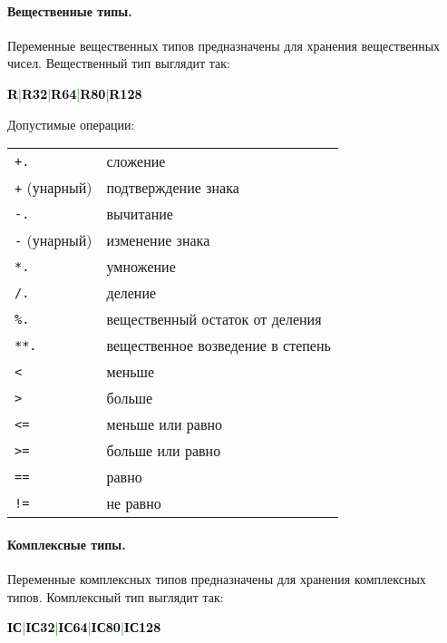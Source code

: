 \documentclass[10pt]{report}
\begin{document}
            \paragraph{Вещественные типы.}Переменные вещественных типов предназначены для хранения вещественных чисел. Вещественный тип выглядит так:
\begin{center}
\noindent\textcolor{Green}{\textcolor{Black}{\textbf{R}}|\textcolor{Black}{\textbf{R32}}|\textcolor{Black}{\textbf{R64}}|\textcolor{Black}{\textbf{R80}}|\textcolor{Black}{\textbf{R128}}}
\end{center}

Допустимые операции:
\begin{longtable}{ll}
\texttt{+.}             & сложение                                          \\
\texttt{+} (унарный)    & подтверждение знака                               \\
\texttt{-.}             & вычитание                                         \\
\texttt{-} (унарный)    & изменение знака                                   \\
\texttt{*.}             & умножение                                         \\
\texttt{/.}             & деление                                           \\
\texttt{\%.}            & вещественный остаток от деления                   \\
\texttt{**.}            & вещественное возведение в степень                 \\
\texttt{<}              & меньше                                            \\
\texttt{>}              & больше                                            \\
\texttt{<=}             & меньше или равно                                  \\
\texttt{>=}             & больше или равно                                  \\
\texttt{==}             & равно                                             \\
\texttt{!=}             & не равно                                          \\
\end{longtable}

            \paragraph{Комплексные типы.}Переменные комплексных типов предназначены для хранения комплексных типов. Комплексный тип выглядит так:
\begin{center}
\noindent\textcolor{Green}{\textcolor{Black}{\textbf{IС}}|\textcolor{Black}{\textbf{IС32}}|\textcolor{Black}{\textbf{IС64}}|\textcolor{Black}{\textbf{IС80}}|\textcolor{Black}{\textbf{IС128}}}
\end{center}
\end{document}
